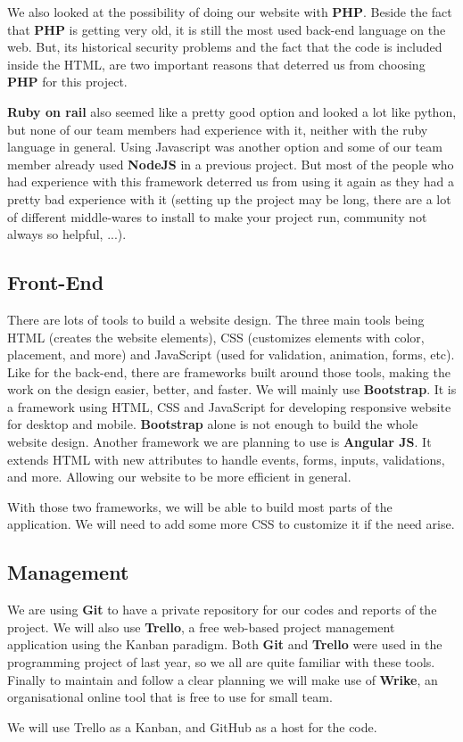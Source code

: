 We also looked at the possibility of doing our website with \textbf{PHP}.
Beside the fact that \textbf{PHP} is getting very old, it is still the most
used back-end language on the web. But, its historical security problems
and the fact that the code is included inside the HTML, are two important
reasons that deterred us from choosing \textbf{PHP} for this
project.\newline

\textbf{Ruby on rail} also seemed like a pretty good option and looked a
lot like python, but none of our team members had experience with it,
neither with the ruby language in general. Using Javascript was another
option and some of our team member already used \textbf{NodeJS} in a
previous project. But most of the people who had experience with this
framework deterred us from using it again as they had a pretty bad
experience with it (setting up the project may be long, there are a lot of
different middle-wares to install to make your project run, community not
always so helpful, ...).

\subsection{Front-End}

There are lots of tools to build a website design. The three main tools
being HTML (creates the website elements), CSS (customizes elements with
color, placement, and more) and JavaScript (used for validation, animation,
forms, etc). Like for the back-end, there are frameworks built around those
tools, making the work on the design easier, better, and faster. We will
mainly use \textbf{Bootstrap}. It is a framework using HTML, CSS and
JavaScript for developing responsive website for desktop and mobile.
\textbf{Bootstrap} alone is not enough to build the whole website design.
Another framework we are planning to use is \textbf{Angular JS}. It extends
HTML with new attributes to handle events, forms, inputs, validations, and
more. Allowing our website to be more efficient in general. \newline

With those two frameworks, we will be able to build most parts of the
application. We will need to add some more CSS to customize it if the
need arise.

\subsection{Management}

We are using \textbf{Git} to have a private repository for our codes and
reports of the project. We will also use \textbf{Trello}, a free web-based
project management application using the Kanban paradigm. Both \textbf{Git}
and \textbf{Trello} were used in the programming project of last year, so
we all are quite familiar with these tools. Finally to maintain and follow a clear planning we will make use of \textbf{Wrike}, an organisational online tool that is free to use for small team.\newline

We will use Trello as a Kanban, and GitHub as a host for the code. \newline

